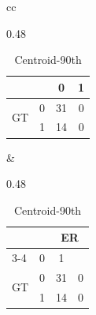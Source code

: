 \begin{table}[!b]
\begin{tabular}{cc}
\begin{subtable}{0.48\columnwidth}
\begin{tabular}{|lc|cc|}
        \multicolumn{2}{|l|}{} & \multicolumn{1}{c|}{0} & \multicolumn{1}{c|}{1} \\ \hline
        \multicolumn{1}{|c|}{\multirow{2}{*}{GT}} & 0 & \multicolumn{1}{c|}{31} & 0 \\ \cline{2-4}
        \multicolumn{1}{|c|}{} & 1 & \multicolumn{1}{c|}{14} & 0 \\ \hline
      \end{tabular}
      \vspace{5pt}
    \end{subtable}
    &
    \begin{subtable}{0.48\columnwidth}
      \centering
      \caption{Centroid-90th}
      \label{matrix_rf_test_d}
      \scriptsize
      \begin{tabular}{|lc|cc|}
        \hline
        \multicolumn{2}{|l|}{\multirow{2}{*}{}} & \multicolumn{2}{c|}{ER} \\ \cline{3-4}
        \multicolumn{2}{|l|}{} & \multicolumn{1}{c|}{0} & \multicolumn{1}{c|}{1} \\ \hline
        \multicolumn{1}{|c|}{\multirow{2}{*}{GT}} & 0 & \multicolumn{1}{c|}{31} & 0 \\ \cline{2-4}
        \multicolumn{1}{|c|}{} & 1 & \multicolumn{1}{c|}{14} & 0 \\ \hline
      \end{tabular}
      \vspace{5pt}
    \end{subtable}
    \\
  \end{tabular}
\end{table}

